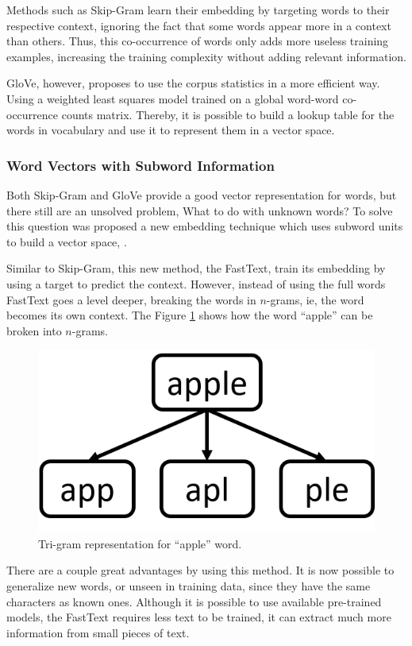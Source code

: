 	Methods such as Skip-Gram learn their embedding by targeting words to their respective context,
	ignoring the fact that some words appear more in a context than others. Thus, this co-occurrence of words only adds more useless training examples, increasing the training complexity without adding relevant information.
	
	GloVe, however, proposes to use the corpus statistics in a more efficient way. Using a weighted least squares model trained on a global word-word co-occurrence counts matrix. Thereby, it is possible to build a lookup table for the words in vocabulary and use it to represent them in a vector space.
	
	
	\subsubsection{Word Vectors with Subword Information}
		
	Both Skip-Gram and GloVe provide a good vector representation for words, but there still are an unsolved problem, What to do with unknown words? To solve this question was proposed a new embedding technique which uses subword units to build a vector space, \cite{bojanowski2017enriching}.
	
	Similar to Skip-Gram, this new method, the FastText, train its embedding by using a target to predict the context. However, instead of using the full words FastText goes a level deeper, breaking the words in $n$-grams, ie, the word becomes its own context. The Figure \ref{fig:apple-tri-gram} shows how the word ``apple'' can be broken into $n$-grams. 
		
	\begin{figure}[h!]
		\centering
		\includegraphics[width=0.3\linewidth]{01.Chapters/02.Background/apple-tri-gram}
		\caption{Tri-gram representation for ``apple'' word.}
		\label{fig:apple-tri-gram}
	\end{figure}
	
	There are a couple great advantages by using this method. It is now possible to generalize new words, or unseen in training data, since they have the same characters as known ones. Although it is possible to use available pre-trained models, the FastText requires less text to be trained, it can extract much more information from small pieces of text.	
	
